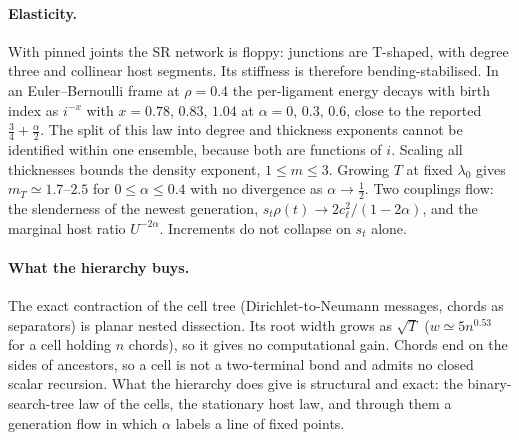 \paragraph{Elasticity.}
With pinned joints the SR network is floppy: junctions are T-shaped, with
degree three and collinear host segments. Its stiffness is therefore
bending-stabilised. In an Euler--Bernoulli frame at $\rho=0.4$ the
per-ligament energy decays with birth index as $i^{-x}$ with
$x=0.78,\,0.83,\,1.04$ at $\alpha=0,\,0.3,\,0.6$, close to the reported
$\tfrac34+\tfrac\alpha2$. The split of this law into degree and thickness
exponents cannot be identified within one ensemble, because both are functions
of $i$. Scaling all thicknesses bounds the density exponent,
$1\le m\le 3$. Growing $T$ at fixed $\lambda_0$ gives $m_T\simeq1.7$--$2.5$ for
$0\le\alpha\le0.4$ with no divergence as $\alpha\to\tfrac12$. Two couplings
flow: the slenderness of the newest generation, $s_t\rho(t)\to2c_\ell^2/(1-2\alpha)$,
and the marginal host ratio $U^{-2\alpha}$. Increments do not collapse on
$s_t$ alone.

\paragraph{What the hierarchy buys.}
The exact contraction of the cell tree (Dirichlet-to-Neumann messages,
chords as separators) is planar nested dissection. Its root width grows as
$\sqrt T$ ($w\simeq5n^{0.53}$ for a cell holding $n$ chords), so it gives no
computational gain. Chords end on the sides of ancestors, so a cell is not a
two-terminal bond and admits no closed scalar recursion. What the hierarchy
does give is structural and exact: the binary-search-tree law of the cells,
the stationary host law, and through them a generation flow in which $\alpha$
labels a line of fixed points.
